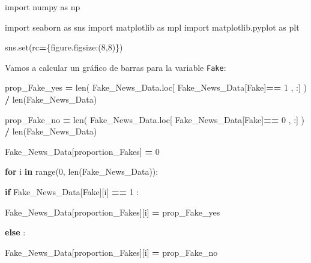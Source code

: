 \documentclass[
  11pt,
  a4paper,
]{article}
\newenvironment{Shaded}{\begin{snugshade}}{\end{snugshade}}
\newcommand{\BuiltInTok}[1]{#1}
\newcommand{\ControlFlowTok}[1]{\textcolor[rgb]{0.13,0.29,0.53}{\textbf{#1}}}
\newcommand{\DecValTok}[1]{\textcolor[rgb]{0.00,0.00,0.81}{#1}}
\newcommand{\ImportTok}[1]{#1}
\newcommand{\KeywordTok}[1]{\textcolor[rgb]{0.13,0.29,0.53}{\textbf{#1}}}
\newcommand{\NormalTok}[1]{#1}
\newcommand{\OperatorTok}[1]{\textcolor[rgb]{0.81,0.36,0.00}{\textbf{#1}}}
\newcommand{\StringTok}[1]{\textcolor[rgb]{0.31,0.60,0.02}{#1}}
\begin{document}
\begin{Shaded}
\begin{Highlighting}[]
\ImportTok{import}\NormalTok{ numpy }\ImportTok{as}\NormalTok{ np}

\ImportTok{import}\NormalTok{ seaborn }\ImportTok{as}\NormalTok{ sns}
\ImportTok{import}\NormalTok{ matplotlib }\ImportTok{as}\NormalTok{ mpl}
\ImportTok{import}\NormalTok{ matplotlib.pyplot }\ImportTok{as}\NormalTok{ plt}

\NormalTok{sns.}\BuiltInTok{set}\NormalTok{(rc}\OperatorTok{=}\NormalTok{\{}\StringTok{\textquotesingle{}figure.figsize\textquotesingle{}}\NormalTok{:(}\DecValTok{8}\NormalTok{,}\DecValTok{8}\NormalTok{)\})}
\end{Highlighting}
\end{Shaded}

Vamos a calcular un gráfico de barras para la variable \texttt{Fake}:

\begin{Shaded}
\begin{Highlighting}[]
\NormalTok{prop\_Fake\_yes }\OperatorTok{=} \BuiltInTok{len}\NormalTok{( Fake\_News\_Data.loc[ Fake\_News\_Data[}\StringTok{\textquotesingle{}Fake\textquotesingle{}}\NormalTok{]}\OperatorTok{==} \DecValTok{1}\NormalTok{ , :] ) }\OperatorTok{/} \BuiltInTok{len}\NormalTok{(Fake\_News\_Data)}

\NormalTok{prop\_Fake\_no }\OperatorTok{=} \BuiltInTok{len}\NormalTok{( Fake\_News\_Data.loc[ Fake\_News\_Data[}\StringTok{\textquotesingle{}Fake\textquotesingle{}}\NormalTok{]}\OperatorTok{==} \DecValTok{0}\NormalTok{ , :] ) }\OperatorTok{/} \BuiltInTok{len}\NormalTok{(Fake\_News\_Data)}
\end{Highlighting}
\end{Shaded}

\begin{Shaded}
\begin{Highlighting}[]
\NormalTok{Fake\_News\_Data[}\StringTok{\textquotesingle{}proportion\_Fakes\textquotesingle{}}\NormalTok{] }\OperatorTok{=} \DecValTok{0}


\ControlFlowTok{for}\NormalTok{ i }\KeywordTok{in} \BuiltInTok{range}\NormalTok{(}\DecValTok{0}\NormalTok{, }\BuiltInTok{len}\NormalTok{(Fake\_News\_Data)):}

    \ControlFlowTok{if}\NormalTok{ Fake\_News\_Data[}\StringTok{\textquotesingle{}Fake\textquotesingle{}}\NormalTok{][i] }\OperatorTok{==} \DecValTok{1}\NormalTok{ :}

\NormalTok{        Fake\_News\_Data[}\StringTok{\textquotesingle{}proportion\_Fakes\textquotesingle{}}\NormalTok{][i] }\OperatorTok{=}\NormalTok{ prop\_Fake\_yes}

    \ControlFlowTok{else}\NormalTok{ :}

\NormalTok{        Fake\_News\_Data[}\StringTok{\textquotesingle{}proportion\_Fakes\textquotesingle{}}\NormalTok{][i] }\OperatorTok{=}\NormalTok{ prop\_Fake\_no}
\end{Highlighting}
\end{Shaded}
\end{document}

